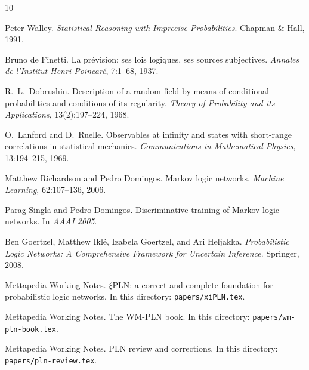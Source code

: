 \documentclass[]{article}
\newcommand{\lpath}[1]{\texttt{\nolinkurl{#1}}}
\begin{document}

\begin{thebibliography}{10}

Peter Walley.
\newblock \emph{Statistical Reasoning with Imprecise Probabilities}.
\newblock Chapman \& Hall, 1991.

Bruno de Finetti.
\newblock La pr\'evision: ses lois logiques, ses sources subjectives.
\newblock \emph{Annales de l'Institut Henri Poincar\'e}, 7:1--68, 1937.

R.\ L.\ Dobrushin.
\newblock Description of a random field by means of conditional
        probabilities and conditions of its regularity.
\newblock \emph{Theory of Probability and its Applications},
        13(2):197--224, 1968.

O.\ Lanford and D.\ Ruelle.
\newblock Observables at infinity and states with short-range correlations
        in statistical mechanics.
\newblock \emph{Communications in Mathematical Physics}, 13:194--215, 1969.

Matthew Richardson and Pedro Domingos.
\newblock Markov logic networks.
\newblock \emph{Machine Learning}, 62:107--136, 2006.

Parag Singla and Pedro Domingos.
\newblock Discriminative training of Markov logic networks.
\newblock In \emph{AAAI 2005}.

Ben Goertzel, Matthew Ikl\'e, Izabela Goertzel, and Ari Heljakka.
\newblock \emph{Probabilistic Logic Networks: A Comprehensive Framework
        for Uncertain Inference}.
\newblock Springer, 2008.

Mettapedia Working Notes.
\newblock $\xi$PLN: a correct and complete foundation for probabilistic
        logic networks.
\newblock In this directory: \lpath{papers/xiPLN.tex}.

Mettapedia Working Notes.
\newblock The WM-PLN book.
\newblock In this directory: \lpath{papers/wm-pln-book.tex}.

Mettapedia Working Notes.
\newblock PLN review and corrections.
\newblock In this directory: \lpath{papers/pln-review.tex}.

\end{thebibliography}
\end{document}

